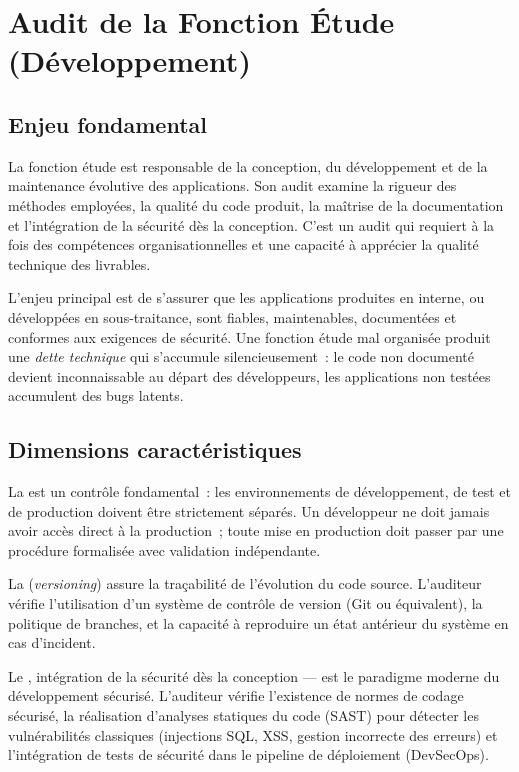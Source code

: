 \section{Audit de la Fonction Étude (Développement)}
\label{sec:audit-etude}

\subsection{Enjeu fondamental}

La fonction étude est responsable de la conception, du développement et de la
maintenance évolutive des applications. Son audit examine la rigueur des méthodes
employées, la qualité du code produit, la maîtrise de la documentation et
l'intégration de la sécurité dès la conception. C'est un audit qui requiert à la
fois des compétences organisationnelles et une capacité à apprécier la qualité
technique des livrables.

L'enjeu principal est de s'assurer que les applications produites en interne, ou
développées en sous-traitance, sont fiables, maintenables, documentées et conformes
aux exigences de sécurité. Une fonction étude mal organisée produit une
\textit{dette technique} qui s'accumule silencieusement~: le code non documenté
devient inconnaissable au départ des développeurs, les applications non testées
accumulent des bugs latents.

\subsection{Dimensions caractéristiques}

La  est un contrôle fondamental~: les
environnements de développement, de test et de production doivent être strictement
séparés. Un développeur ne doit jamais avoir accès direct à la production~; toute
mise en production doit passer par une procédure formalisée avec validation
indépendante.

La  (\textit{versioning}) assure la traçabilité de
l'évolution du code source. L'auditeur vérifie l'utilisation d'un système de contrôle
de version (Git ou équivalent), la politique de branches, et la capacité à reproduire
un état antérieur du système en cas d'incident.

Le , intégration de la sécurité dès la conception —
est le paradigme moderne du développement sécurisé. L'auditeur vérifie l'existence
de normes de codage sécurisé, la réalisation d'analyses statiques du code (SAST)
pour détecter les vulnérabilités classiques (injections SQL, XSS, gestion incorrecte
des erreurs) et l'intégration de tests de sécurité dans le pipeline de déploiement
(DevSecOps).

